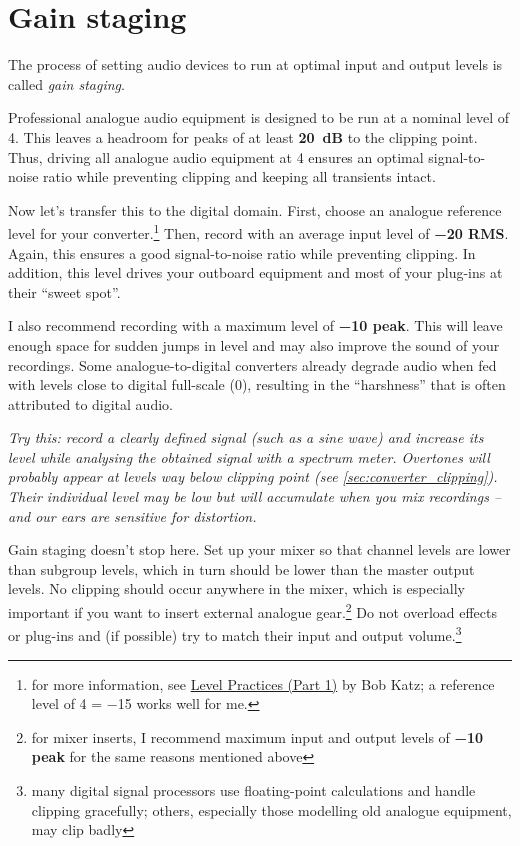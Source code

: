 \section{Gain staging}
\label{sec:gain_staging}

The process of setting audio devices to run at optimal input and
output levels is called \emph{gain staging}.

Professional analogue audio equipment is designed to be run at a
nominal level of \SI[retain-explicit-plus]{+4}{\dBu}.  This leaves a
headroom for peaks of at least \textbf{\SI{20}{\dB}} to the clipping
point.  Thus, driving all analogue audio equipment at
\SI[retain-explicit-plus]{+4}{\dBu} ensures an optimal signal-to-noise
ratio while preventing clipping and keeping all transients intact.

Now let's transfer this to the digital domain.  First, choose an
analogue reference level for your converter.\footnote{for more
  information, see
  \href{https://www.digido.com/portfolio-item/level-practices-part-1/}{Level
    Practices (Part 1)} by Bob Katz; a reference level of
  \SI[retain-explicit-plus]{+4}{\dBu} = \SI{-15}{\dBFS} works well for
  me.}  Then, record with an average input level of
\textbf{\SI{-20}{\dBFS} RMS}.  Again, this ensures a good
signal-to-noise ratio while preventing clipping.  In addition, this
level drives your outboard equipment and most of your plug-ins at
their ``sweet spot''.

I also recommend recording with a maximum level of
\textbf{\SI{-10}{\dBFS} peak}.  This will leave enough space for
sudden jumps in level and may also improve the sound of your
recordings.  Some analogue-to-digital converters already degrade audio
when fed with levels close to digital full-scale (\SI{0}{\dBFS}),
resulting in the ``harshness'' that is often attributed to digital
audio.

\emph{Try this: record a clearly defined signal (such as a sine wave)
  and increase its level while analysing the obtained signal with a
  spectrum meter.  Overtones will probably appear at levels way below
  clipping point (see \ref{sec:converter_clipping}).  Their individual
  level may be low but will accumulate when you mix recordings -- and
  our ears are sensitive for distortion.}

Gain staging doesn't stop here.  Set up your mixer so that channel
levels are lower than subgroup levels, which in turn should be lower
than the master output levels.  No clipping should occur anywhere in
the mixer, which is especially important if you want to insert
external analogue gear.\footnote{for mixer inserts, I recommend
  maximum input and output levels of \textbf{\SI{-10}{\dBFS} peak} for
  the same reasons mentioned above} Do not overload effects or
plug-ins and (if possible) try to match their input and output
volume.\footnote{many digital signal processors use floating-point
  calculations and handle clipping gracefully; others, especially
  those modelling old analogue equipment, may clip badly}

